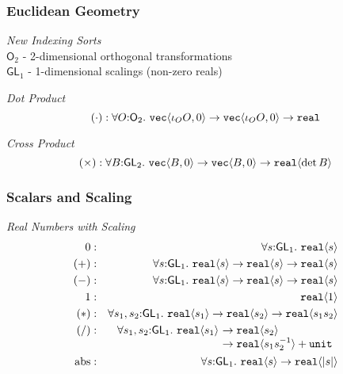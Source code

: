 \documentclass[xetex,serif,mathserif]{beamer}
\newcommand{\abs}[1]{\lvert #1 \rvert}
\newcommand{\SynGL}[1]{\mathsf{GL}_#1}
\newcommand{\SynOrth}[1]{\mathsf{O}_#1}
\newcommand{\tyPrim}[2]{\textup{\texttt{#1}}\langle #2 \rangle}
\newcommand{\tyPrimNm}[1]{\textup{\texttt{#1}}}
\newenvironment{slide}[1]{\begin{frame}\frametitle{#1}}{\end{frame}}
\begin{document}
\begin{slide}{Euclidean Geometry}
  \textcolor{titlered}{\emph{New Indexing Sorts}} \\
  \quad $\SynOrth{2}$ - 2-dimensional orthogonal transformations \\
  \quad $\SynGL{1}$ - 1-dimensional scalings (non-zero reals) 

  \bigskip

  \textcolor{titlered}{\emph{Dot Product}} \\
  \begin{displaymath}
    (\cdot) : \forall O \mathord: \SynOrth{2}.\ \tyPrim{vec}{\iota_OO, 0} \to \tyPrim{vec}{\iota_OO, 0} \to \tyPrimNm{real}
  \end{displaymath}

  \textcolor{titlered}{\emph{Cross Product}} \\
  \begin{displaymath}
    (\times) : \forall B \mathord: \SynGL{2}.\ \tyPrim{vec}{B,0} \to
    \tyPrim{vec}{B,0} \to \tyPrim{real}{\det B} 
  \end{displaymath}

\end{slide}

\begin{slide}{Scalars and Scaling}
  \textcolor{titlered}{\emph{Real Numbers with Scaling}}
  \begin{eqnarray*}
    0   &:& \forall s \mathord:\SynGL{1}.\ \tyPrim{real}{s} \\
    (+) &:& \forall s \mathord:\SynGL{1}.\ \tyPrim{real}{s} \to \tyPrim{real}{s} \to \tyPrim{real}{s} \\
    (-) &:& \forall s \mathord:\SynGL{1}.\ \tyPrim{real}{s} \to \tyPrim{real}{s} \to \tyPrim{real}{s} \\
    1   &:& \tyPrim{real}{1} \\
    (*) &:& \forall s_1,s_2 \mathord:\SynGL{1}.\ \tyPrim{real}{s_1} \to \tyPrim{real}{s_2} \to \tyPrim{real}{s_1s_2} \\
    (/) &:&
    \begin{array}[t]{@{}l@{}l}
      \forall s_1,s_2 \mathord:\SynGL{1}.\ \tyPrim{real}{s_1}\ & \to \tyPrim{real}{s_2} \\
      &\to \tyPrim{real}{s_1s_2^{-1}} + \tyPrimNm{unit} \\
    \end{array}\\
    \mathrm{abs} &:& \forall s \mathord:\SynGL{1}.\ \tyPrim{real}{s} \to \tyPrim{real}{\abs{s}} %
  \end{eqnarray*}

\end{slide}
\end{document}

